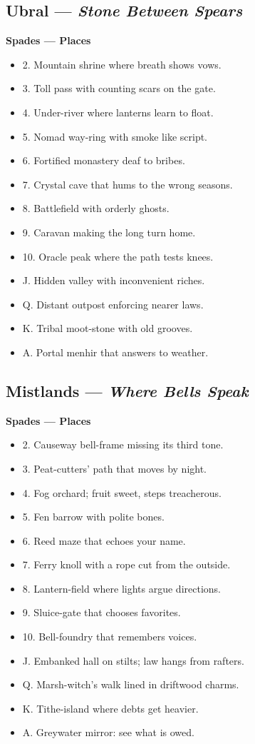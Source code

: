 \begin{multicols}{2}
\subsection*{Ubral — \textit{Stone Between Spears}}
\textbf{Spades — Places}
\begin{itemize}
  \item 2. Mountain shrine where breath shows vows.
  \item 3. Toll pass with counting scars on the gate.
  \item 4. Under-river where lanterns learn to float.
  \item 5. Nomad way-ring with smoke like script.
  \item 6. Fortified monastery deaf to bribes.
  \item 7. Crystal cave that hums to the wrong seasons.
  \item 8. Battlefield with orderly ghosts.
  \item 9. Caravan making the long turn home.
  \item 10. Oracle peak where the path tests knees.
  \item J. Hidden valley with inconvenient riches.
  \item Q. Distant outpost enforcing nearer laws.
  \item K. Tribal moot-stone with old grooves.
  \item A. Portal menhir that answers to weather.
\end{itemize}

\subsection*{Mistlands — \textit{Where Bells Speak}}
\textbf{Spades — Places}
\begin{itemize}
  \item 2. Causeway bell-frame missing its third tone.
  \item 3. Peat-cutters’ path that moves by night.
  \item 4. Fog orchard; fruit sweet, steps treacherous.
  \item 5. Fen barrow with polite bones.
  \item 6. Reed maze that echoes your name.
  \item 7. Ferry knoll with a rope cut from the outside.
  \item 8. Lantern-field where lights argue directions.
  \item 9. Sluice-gate that chooses favorites.
  \item 10. Bell-foundry that remembers voices.
  \item J. Embanked hall on stilts; law hangs from rafters.
  \item Q. Marsh-witch’s walk lined in driftwood charms.
  \item K. Tithe-island where debts get heavier.
  \item A. Greywater mirror: see what is owed.
\end{itemize}


\end{multicols}
